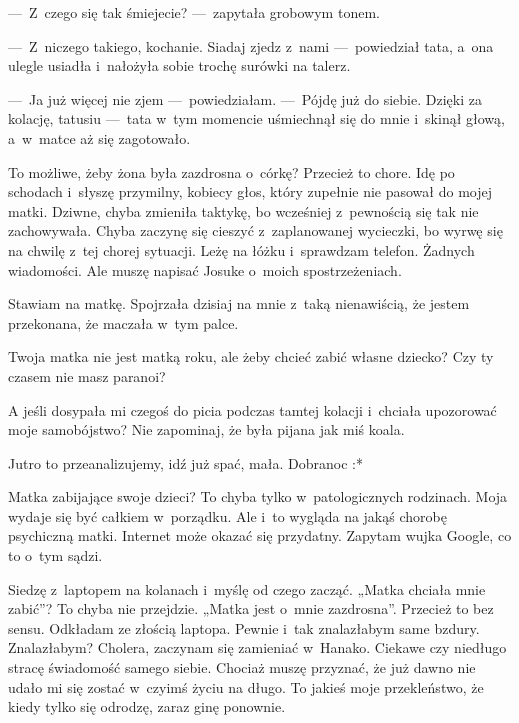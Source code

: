 ---~Z~czego się tak śmiejecie? ---~zapytała grobowym tonem.

---~Z~niczego takiego, kochanie. Siadaj zjedz z~nami ---~powiedział tata, a~ona ulegle usiadła i~nałożyła sobie trochę surówki na talerz.

---~Ja już więcej nie zjem ---~powiedziałam. ---~Pójdę już do siebie. Dzięki za kolację, tatusiu ---~tata w~tym momencie uśmiechnął się do mnie i~skinął głową, a~w~matce aż się zagotowało. 

To możliwe, żeby żona była zazdrosna o~córkę? Przecież to chore. Idę po schodach i~słyszę przymilny, kobiecy głos, który zupełnie nie pasował do mojej matki. Dziwne, chyba zmieniła taktykę, bo wcześniej z~pewnością się tak nie zachowywała. Chyba zaczynę się cieszyć z~zaplanowanej wycieczki, bo wyrwę się na chwilę z~tej chorej sytuacji. Leżę na łóżku i~sprawdzam telefon. Żadnych wiadomości. Ale muszę napisać Josuke o~moich spostrzeżeniach.

\begin{sms}
Stawiam na matkę. Spojrzała dzisiaj na mnie z~taką nienawiścią, że jestem przekonana, że maczała w~tym palce.
\end{sms}

\begin{sms}
Twoja matka nie jest matką roku, ale żeby chcieć zabić własne dziecko? Czy ty czasem nie masz paranoi?
\end{sms}

\begin{sms}
A jeśli dosypała mi czegoś do picia podczas tamtej kolacji i~chciała upozorować moje samobójstwo? Nie zapominaj, że była pijana jak miś koala.
\end{sms}

\begin{sms}
Jutro to przeanalizujemy, idź już spać, mała. Dobranoc :*
\end{sms}

Matka zabijające swoje dzieci? To chyba tylko w~patologicznych rodzinach. Moja wydaje się być całkiem w~porządku. Ale i~to wygląda na jakąś chorobę psychiczną matki. Internet może okazać się przydatny. Zapytam wujka Google, co to o~tym sądzi. 

Siedzę z~laptopem na kolanach i~myślę od czego zacząć. „Matka chciała mnie zabić”? To chyba nie przejdzie. „Matka jest o~mnie zazdrosna”. Przecież to bez sensu. Odkładam ze złością laptopa. Pewnie i~tak znalazłabym same bzdury. Znalazłabym? Cholera, zaczynam się zamieniać w~Hanako. Ciekawe czy niedługo stracę świadomość samego siebie. Chociaż muszę przyznać, że już dawno nie udało mi się zostać w~czyimś życiu na długo. To jakieś moje przekleństwo, że kiedy tylko się odrodzę, zaraz ginę ponownie. 

